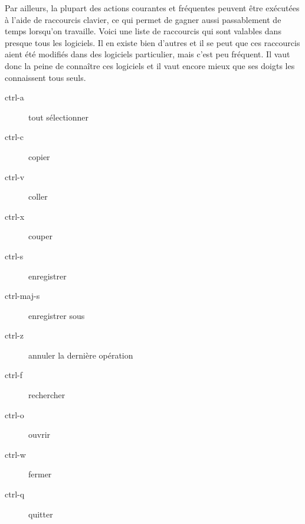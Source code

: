 \documentclass[10pt,a4paper]{report}
\begin{document}
Par ailleurs, la plupart des actions courantes et fréquentes peuvent être exécutées à l'aide de raccourcis clavier, ce qui permet de gagner aussi passablement de temps lorsqu'on travaille. Voici une liste de raccourcis qui sont valables dans presque tous les logiciels. Il en existe bien d'autres et il se peut que ces raccourcis aient été modifiés dans des logiciels particulier, mais c'est peu fréquent. Il vaut donc la peine de connaître ces logiciels et il vaut encore mieux que ses doigts les connaissent tous seuls.


\begin{description}
	\item[ctrl-a] tout sélectionner
	\item[ctrl-c] copier
	\item[ctrl-v] coller
	\item[ctrl-x] couper
	\item[ctrl-s] enregistrer
	\item[ctrl-maj-s] enregistrer sous
	\item[ctrl-z] annuler la dernière opération
	\item[ctrl-f] rechercher
	\item[ctrl-o] ouvrir
	\item[ctrl-w] fermer
	\item[ctrl-q] quitter
\end{description}










\nocite{CreusetsNet,ENTEnvironnementNumerique,MoodleLCC}
\printbibliography[title=Notes bibliographiques,heading=subbibnumbered]
\end{document}
